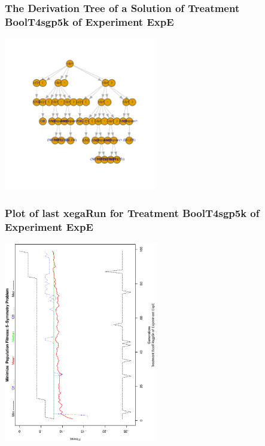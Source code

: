 \documentclass[18pt,c]{beamer}
\begin{document}
 \begin{frame}
 \frametitle{ The Derivation Tree of a Solution of Treatment BoolT4sgp5k of Experiment ExpE }
 \begin{center}
\includegraphics[width=0.5\textwidth, angle=0]
{ExpEDerivationTreeFigure003.pdf}
 \end{center}
 \label{report/ExpEDerivationTreeFigure003.pdf}  
 \end{frame}

 \begin{frame}
 \frametitle{ Plot of last xegaRun for Treatment BoolT4sgp5k of Experiment ExpE }
 \begin{center}
\includegraphics[width=0.5\textwidth, angle=-90]
{ExpEPlotPopStatsFigure003.eps}
 \end{center}
 \label{report/ExpEPlotPopStatsFigure003.eps}  
 \end{frame}
\end{document}
